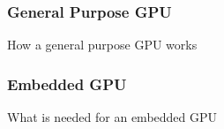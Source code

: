 \subsubsection*{General Purpose GPU}

How a general purpose GPU works

\subsubsection*{Embedded GPU}
What is needed for an embedded GPU
